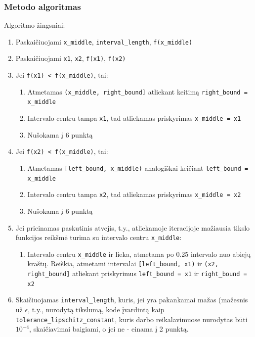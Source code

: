 \documentclass[lithuanian,a4paper,12pt]{article}
\newcommand{\mil}{\texttt}
\begin{document}
\subsubsection*{Metodo algoritmas}
Algoritmo žingsniai:
\begin{enumerate}
    \item Paskaičiuojami \mil{x_middle}, \mil{interval_length}, \mil{f(x_middle)}
    \item Paskaičiuojami \mil{x1}, \mil{x2}, \mil{f(x1)}, \mil{f(x2)}
    \item Jei \mil{f(x1) < f(x_middle)}, tai:
    \begin{enumerate}
        \item Atmetamas \mil{(x_middle, right_bound]} atliekant keitimą \mil{right_bound = x_middle}
        \item Intervalo centru tampa \mil{x1}, tad atliekamas priskyrimas \mil{x_middle = x1}
        \item Nušokama į 6 punktą
    \end{enumerate}
    \item Jei \mil{f(x2) < f(x_middle)}, tai:
    \begin{enumerate}
        \item Atmetamas \mil{[left_bound, x_middle)} analogiškai keičiant \mil{left_bound = x_middle}
        \item Intervalo centru tampa \mil{x2}, tad atliekamas priskyrimas \mil{x_middle = x2}
        \item Nušokama į 6 punktą
    \end{enumerate}
    \item Jei prieinamas paskutinis atvejis, t.y., atliekamoje iteracijoje mažiausia tikslo funkcijos reikšmė turima su intervalo centru \mil{x_middle}: 
    \begin{enumerate}
        \item Intervalo centru \mil{x_middle} ir lieka, atmetama po 0.25 intervalo nuo abiejų kraštų. Reiškia, atmetami intervalai \mil{[left_bound, x1)} ir \mil{(x2, right_bound]} atliekant priskyrimus \mil{left_bound = x1} ir \mil{right_bound = x2}
    \end{enumerate}
    \item Skaičiuojamas \mil{interval_length}, kuris, jei yra pakankamai mažas (mažesnis už 
    $\epsilon$, t.y., nurodytą tikslumą, kode įvardintą kaip \mil{tolerance_lipschitz_constant}, kuris darbo reikalavimuose nurodytas būti $10^{-4}$, skaičiavimai baigiami, o jei ne - einama į 2 punktą. 
\end{enumerate}
\end{document}
